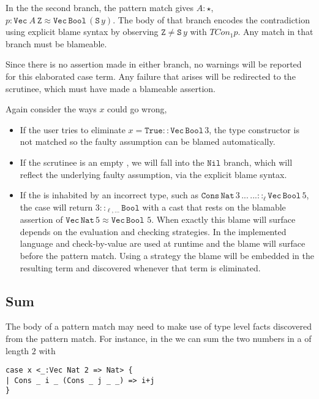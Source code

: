 In the the second branch, the pattern match gives $A:\star$, $p:\mathtt{Vec}\ A\ \mathtt{Z}\approx\mathtt{Vec}\,\mathtt{Bool}\,(\mathtt{S}\,y)$.
The body of that branch encodes the contradiction using explicit blame syntax by observing $\mathtt{Z}\neq\mathtt{S}\,y$ with $TCon_{1}p$.
Any match in that branch must be blameable.
 
Since there is no assertion made in either branch, no warnings will be reported for this elaborated case term.
Any failure that arises will be redirected to the scrutinee, which must have made a blameable assertion.
 
Again consider the ways $x$ could go wrong,
\begin{itemize}
\item
If the user tries to eliminate $x=\mathtt{True}::\mathtt{Vec}\,\mathtt{Bool}\,3$, the type constructor is not matched so the faulty assumption can be blamed automatically.
\item
If the scrutinee is an empty \Vect{}, we will fall into the $\mathtt{Nil}$ branch, which will reflect the underlying faulty assumption, via the explicit blame syntax.
\item
If the \Vect{} is inhabited by an incorrect type, such as $\mathtt{Cons}\,\mathtt{Nat}\,3\,...\,...::_{\ell}\mathtt{Vec}\,\mathtt{Bool}\,5$, the case will return $3::_{\ell,...}\mathtt{Bool}$ with a cast that rests on the blamable assertion of $\mathtt{Vec}\,\mathtt{Nat}\,5\approx\mathtt{Vec}\,\mathtt{Bool}\,\,5$.
When exactly this blame will surface depends on the evaluation and checking strategies.
In the implemented language \cbv{} and check-by-value are used at runtime and the blame will surface before the pattern match.
Using a \whnf{} strategy the blame will be embedded in the resulting term and discovered whenever that term is eliminated. %
\end{itemize}
 
\subsection{Sum}
 
The body of a pattern match may need to make use of type level facts discovered from the pattern match.
For instance, in the \slang{} we can  sum the two numbers in a \Vect{} of length $2$ with
 
\begin{lstlisting}[basicstyle={\ttfamily\small}]
case x <_:Vec Nat 2 => Nat> {
| Cons _ i _ (Cons _ j _ _) => i+j
}
\end{lstlisting}
 
